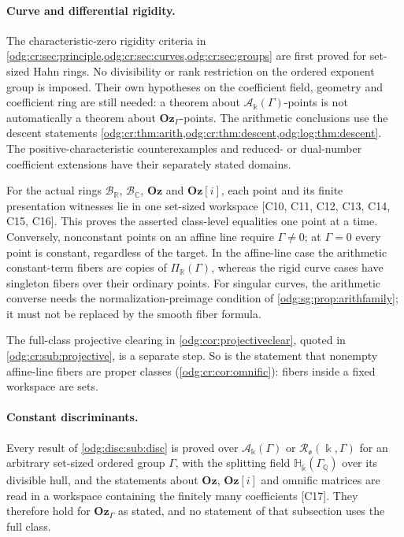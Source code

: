\documentclass[11pt,oneside]{article}
\numberwithin{equation}{section}
\theoremstyle{definition}
\theoremstyle{remark}
\newcommand{\Oz}{\mathbf{Oz}}
\newcommand{\Q}{\mathbb Q}
\newcommand{\R}{\mathbb R}
\newcommand{\C}{\mathbb C}
\newcommand{\BR}{\mathcal B_{\R}}
\newcommand{\BC}{\mathcal B_{\C}}
\newcommand{\src}[1]{\textup{\textsf{\small[#1]}}}
\newcommand{\Og}{\Oz[i]}
\newcommand{\crA}{\mathcal A_\Bbbk(\Gamma)}
\newcommand{\Hbar}{\mathbb H_{\bar\Bbbk}(\Gamma_\Q)}
\begin{document}
\paragraph{Curve and differential rigidity.} The characteristic-zero
rigidity criteria in
\cref{odg:cr:sec:principle,odg:cr:sec:curves,odg:cr:sec:groups}
are first proved for set-sized Hahn rings. No divisibility or rank
restriction on the ordered exponent group is imposed. Their own hypotheses
on the coefficient field, geometry and coefficient ring are still needed:
a theorem about $\crA$-points is not automatically a theorem about
$\Oz_\Gamma$-points. The arithmetic conclusions use the descent statements
\cref{odg:cr:thm:arith,odg:cr:thm:descent,odg:log:thm:descent}.
The positive-characteristic counterexamples and reduced- or dual-number
coefficient extensions have their separately stated domains.

For the actual rings $\BR$, $\BC$, $\Oz$ and $\Og$, each point and its
finite presentation witnesses lie in one set-sized workspace
\src{C10, C11, C12, C13, C14, C15, C16}. This proves the asserted
class-level equalities one point at a time. Conversely, nonconstant points
on an affine line require $\Gamma\ne0$; at $\Gamma=0$ every point is
constant, regardless of the target. In the affine-line case the arithmetic
constant-term fibers are copies of $\Pi_\R(\Gamma)$, whereas the rigid
curve cases have singleton fibers over their ordinary points. For singular
curves, the arithmetic converse needs the normalization-preimage condition
of \cref{odg:sg:prop:arithfamily}; it must not be replaced by the smooth
fiber formula.

The full-class projective clearing in
\cref{odg:cor:projectiveclear}, quoted in
\cref{odg:cr:sub:projective}, is a separate step. So is the statement that
nonempty affine-line fibers are proper classes
(\cref{odg:cr:cor:omnific}): fibers inside a fixed workspace are sets.

\paragraph{Constant discriminants.} Every result of \cref{odg:disc:sub:disc} is proved over
$\crA$ or $\mathcal R_{\mathfrak o}(\Bbbk,\Gamma)$ for an arbitrary set-sized ordered group
$\Gamma$, with the splitting field $\Hbar$ over its divisible hull, and the statements about
$\Oz$, $\Og$ and omnific matrices are read in a workspace containing the finitely many
coefficients \src{C17}. They therefore hold for $\Oz_\Gamma$ as stated, and no statement of
that subsection uses the full class.
\end{document}
